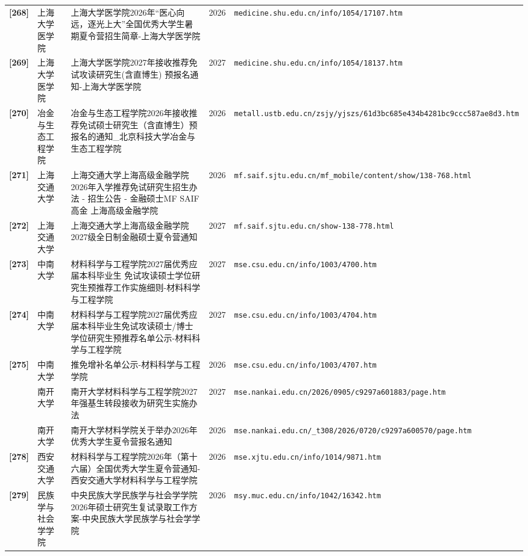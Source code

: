 {\begin{longtable}{@{}p{1.15cm}p{2.9cm}p{6.3cm}p{0.85cm}p{5.0cm}@{}}
\textbf{[268]} & 上海大学医学院 & 上海大学医学院2026年“医心向远，逐光上大”全国优秀大学生暑期夏令营招生简章-上海大学医学院 & 2026 & \texttt{medicine.shu.edu.cn/info/1054/17107.htm} \\
\textbf{[269]} & 上海大学医学院 & 上海大学医学院2027年接收推荐免试攻读研究生(含直博生) 预报名通知-上海大学医学院 & 2027 & \texttt{medicine.shu.edu.cn/info/1054/18137.htm} \\
\textbf{[270]} & 冶金与生态工程学院 & 冶金与生态工程学院2026年接收推荐免试硕士研究生（含直博生）预报名的通知\_北京科技大学冶金与生态工程学院 & 2026 & \texttt{metall.ustb.edu.cn/zsjy/yjszs/61d3bc685e434b4281bc9ccc587ae8d3.htm} \\
\textbf{[271]} & 上海交通大学 & 上海交通大学上海高级金融学院2026年入学推荐免试研究生招生办法 - 招生公告 - 金融硕士MF \textbar{} SAIF \textbar{} 高金 \textbar{} 上海高级金融学院 & 2026 & \texttt{mf.saif.sjtu.edu.cn/mf\_mobile/content/show/138-768.html} \\
\textbf{[272]} & 上海交通大学 & 上海交通大学上海高级金融学院 2027级全日制金融硕士夏令营通知 & 2027 & \texttt{mf.saif.sjtu.edu.cn/show-138-778.html} \\
\textbf{[273]} & 中南大学 & 材料科学与工程学院2027届优秀应届本科毕业生 免试攻读硕士学位研究生预推荐工作实施细则-材料科学与工程学院 & 2027 & \texttt{mse.csu.edu.cn/info/1003/4700.htm} \\
\textbf{[274]} & 中南大学 & 材料科学与工程学院2027届优秀应届本科毕业生免试攻读硕士/博士学位研究生预推荐名单公示-材料科学与工程学院 & 2027 & \texttt{mse.csu.edu.cn/info/1003/4704.htm} \\
\textbf{[275]} & 中南大学 & 推免增补名单公示-材料科学与工程学院 & 2026 & \texttt{mse.csu.edu.cn/info/1003/4707.htm} \\
[276] & 南开大学 & 南开大学材料科学与工程学院2027年强基生转段接收为研究生实施办法 & 2027 & \texttt{mse.nankai.edu.cn/2026/0905/c9297a601883/page.htm} \\
[277] & 南开大学 & 南开大学材料学院关于举办2026年优秀大学生夏令营报名通知 & 2026 & \texttt{mse.nankai.edu.cn/\_t308/2026/0720/c9297a600570/page.htm} \\
\textbf{[278]} & 西安交通大学 & 材料科学与工程学院2026年（第十六届）全国优秀大学生夏令营通知-西安交通大学材料科学与工程学院 & 2026 & \texttt{mse.xjtu.edu.cn/info/1014/9871.htm} \\
\textbf{[279]} & 民族学与社会学学院 & 中央民族大学民族学与社会学学院2026年硕士研究生复试录取工作方案-中央民族大学民族学与社会学学院 & 2026 & \texttt{msy.muc.edu.cn/info/1042/16342.htm} \\

\end{longtable}}
